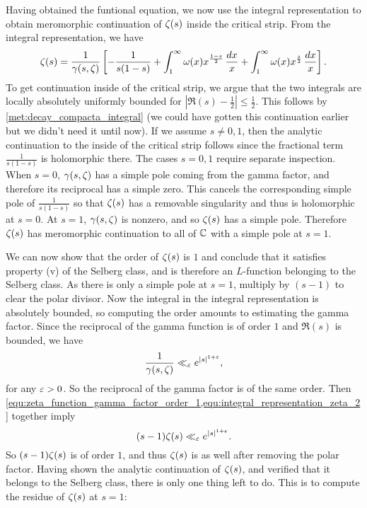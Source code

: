       Having obtained the funtional equation, we now use the integral representation to obtain meromorphic continuation of $\zeta(s)$ inside the critical strip. From the integral representation, we have
      \begin{equation}\label{equ:integral_representation_zeta_2}
        \zeta(s) = \frac{1}{\gamma(s,\zeta)}\left[-\frac{1}{s(1-s)}+\int_{1}^{\infty}\omega(x)x^{\frac{1-s}{2}}\,\frac{dx}{x}+\int_{1}^{\infty}\omega(x)x^{\frac{s}{2}}\,\frac{dx}{x}\right].
      \end{equation}
      To get continuation inside of the critical strip, we argue that the two integrals are locally absolutely uniformly bounded for $|\Re(s)-\frac{1}{2}| \le \frac{1}{2}$. This follows by \cref{met:decay_compacta_integral} (we could have gotten this continuation earlier but we didn't need it until now). If we assume $s \neq 0,1$, then the analytic continuation to the inside of the critical strip follows since the fractional term $\frac{1}{s(1-s)}$ is holomorphic there. The cases $s = 0,1$ require separate inspection. When $s = 0$, $\gamma(s,\zeta)$ has a simple pole coming from the gamma factor, and therefore its reciprocal has a simple zero. This cancels the corresponding simple pole of $\frac{1}{s(1-s)}$ so that $\zeta(s)$ has a removable singularity and thus is holomorphic at $s = 0$. At $s = 1$, $\gamma(s,\zeta)$ is nonzero, and so $\zeta(s)$ has a simple pole. Therefore $\zeta(s)$ has meromorphic continuation to all of $\mathbb{C}$ with a simple pole at $s = 1$.

      We can now show that the order of $\zeta(s)$ is $1$ and conclude that it satisfies property (v) of the Selberg class, and is therefore an $L$-function belonging to the Selberg class. As there is only a simple pole at $s = 1$, multiply by $(s-1)$ to clear the polar divisor. Now the integral in the integral representation is absolutely bounded, so computing the order amounts to estimating the gamma factor. Since the reciprocal of the gamma function is of order $1$ and $\Re(s)$ is bounded, we have
      \begin{equation}\label{equ:zeta_function_gamma_factor_order_1}
        \frac{1}{\gamma(s,\zeta)} \ll_{\varepsilon} e^{|s|^{1+\varepsilon}},
      \end{equation}
      for any $\varepsilon > 0$. So the reciprocal of the gamma factor is of the same order. Then \cref{equ:zeta_function_gamma_factor_order_1,equ:integral_representation_zeta_2} together imply
      \[
        (s-1)\zeta(s) \ll_{\varepsilon} e^{|s|^{1+\varepsilon}}.
      \]
      So $(s-1)\zeta(s)$ is of order $1$, and thus $\zeta(s)$ is as well after removing the polar factor. Having shown the analytic continuation of $\zeta(s)$, and verified that it belongs to the Selberg class, there is only one thing left to do. This is to compute the residue of $\zeta(s)$ at $s = 1$:

